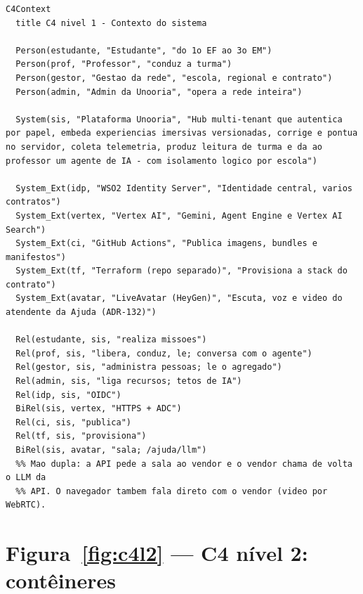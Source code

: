 \begin{lstlisting}[language=mermaid]
C4Context
  title C4 nivel 1 - Contexto do sistema

  Person(estudante, "Estudante", "do 1o EF ao 3o EM")
  Person(prof, "Professor", "conduz a turma")
  Person(gestor, "Gestao da rede", "escola, regional e contrato")
  Person(admin, "Admin da Unooria", "opera a rede inteira")

  System(sis, "Plataforma Unooria", "Hub multi-tenant que autentica por papel, embeda experiencias imersivas versionadas, corrige e pontua no servidor, coleta telemetria, produz leitura de turma e da ao professor um agente de IA - com isolamento logico por escola")

  System_Ext(idp, "WSO2 Identity Server", "Identidade central, varios contratos")
  System_Ext(vertex, "Vertex AI", "Gemini, Agent Engine e Vertex AI Search")
  System_Ext(ci, "GitHub Actions", "Publica imagens, bundles e manifestos")
  System_Ext(tf, "Terraform (repo separado)", "Provisiona a stack do contrato")
  System_Ext(avatar, "LiveAvatar (HeyGen)", "Escuta, voz e video do atendente da Ajuda (ADR-132)")

  Rel(estudante, sis, "realiza missoes")
  Rel(prof, sis, "libera, conduz, le; conversa com o agente")
  Rel(gestor, sis, "administra pessoas; le o agregado")
  Rel(admin, sis, "liga recursos; tetos de IA")
  Rel(idp, sis, "OIDC")
  BiRel(sis, vertex, "HTTPS + ADC")
  Rel(ci, sis, "publica")
  Rel(tf, sis, "provisiona")
  BiRel(sis, avatar, "sala; /ajuda/llm")
  %% Mao dupla: a API pede a sala ao vendor e o vendor chama de volta o LLM da
  %% API. O navegador tambem fala direto com o vendor (video por WebRTC).
\end{lstlisting}

\section{Figura~\ref{fig:c4l2} --- C4 nível 2: contêineres}

